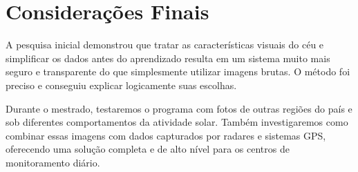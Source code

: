 \section{Considerações Finais}\label{sec:conclusion}

A pesquisa inicial demonstrou que tratar as características visuais do céu e simplificar os dados antes do aprendizado resulta em um sistema muito mais seguro e transparente do que simplesmente utilizar imagens brutas. O método foi preciso e conseguiu explicar logicamente suas escolhas.

Durante o mestrado, testaremos o programa com fotos de outras regiões do país e sob diferentes comportamentos da atividade solar. Também investigaremos como combinar essas imagens com dados capturados por radares e sistemas GPS, oferecendo uma solução completa e de alto nível para os centros de monitoramento diário.
